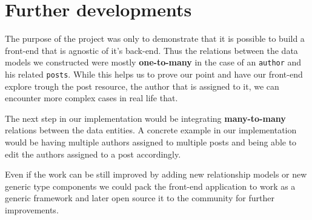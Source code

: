 \section{Further developments}
\label{sec:further-developments}

The purpose of the project was only to demonstrate that it is possible to build a front-end that is agnostic of it's back-end. Thus the relations between the data models we constructed were mostly \textbf{one-to-many} in the case of an \texttt{author} and his related \texttt{posts}. While this helps us to prove our point and have our front-end explore trough the post resource, the author that is assigned to it, we can encounter more complex cases in real life that.

The next step in our implementation would be integrating \textbf{many-to-many} relations between the data entities. A concrete example in our implementation would be having multiple authors assigned to multiple posts and being able to edit the authors assigned to a post accordingly.

Even if the work can be still improved by adding new relationship models or new generic type components we could pack the front-end application to work as a generic framework and later open source it to the community for further improvements.